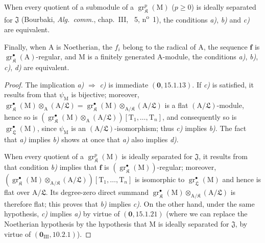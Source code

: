 \begin{theorem}[19.7.1]
When every quotient of a submodule of a $\operatorname{gr}_\mathfrak K^p(\mathrm{M})$ \textup{($p\geqslant 0$)} is ideally separated for $\mathfrak{J}$ \textup{(Bourbaki, \emph{Alg.~comm.}, chap.~III, \textsection~5, n\textsuperscript{o}~1)}, the conditions \emph{a)}, \emph{b)} and \emph{c)} are equivalent.

Finally, when $\mathrm{A}$ is Noetherian, the $f_i$ belong to the radical of $\mathrm{A}$, the sequence $\mathbf{f}$ is $\operatorname{gr}_\mathfrak K^\bullet(\mathrm{A})$-regular, and $\mathrm{M}$ is a finitely generated $\mathrm{A}$-module, the conditions \emph{a)}, \emph{b)}, \emph{c)}, \emph{d)} are equivalent.
\end{theorem}

\begin{proof}
The implication \emph{a)} $\Rightarrow$ \emph{c)} is immediate $(\mathbf{0},15.1.13)$. If \emph{c)} is satisfied, it results from  that $\psi_\mathrm{M}$ is bijective; moreover, $\operatorname{gr}_\mathfrak K^\bullet(\mathrm{M})\otimes_\mathrm{A}(\mathrm{A}/\mathfrak{L})=\operatorname{gr}_\mathfrak K^\bullet(\mathrm{M})\otimes_{\mathrm{A}/\mathfrak K}(\mathrm{A}/\mathfrak{L})$ is a flat $(\mathrm{A}/\mathfrak{L})$-module, hence so is $(\operatorname{gr}_\mathfrak K^\bullet(\mathrm{M})\otimes_\mathrm{A}(\mathrm{A}/\mathfrak{L}))[\mathrm{T}_1,\ldots,\mathrm{T}_n]$, and consequently so is $\operatorname{gr}_\mathfrak{L}^\bullet(\mathrm{M})$, since $\psi_\mathrm{M}$ is an $(\mathrm{A}/\mathfrak{L})$-isomorphism; thus \emph{c)} implies \emph{b)}. The fact that \emph{a)} implies \emph{b)} shows at once that \emph{a)} also implies \emph{d)}.

When every quotient of a $\operatorname{gr}_\mathfrak K^p(\mathrm{M})$ is ideally separated for $\mathfrak{J}$, it results from  that condition \emph{b)} implies that $\mathbf{f}$ is $(\operatorname{gr}_\mathfrak K^\bullet(\mathrm{M}))$-regular; moreover, $(\operatorname{gr}_\mathfrak K^\bullet(\mathrm{M})\otimes_{\mathrm{A}/\mathfrak K}(\mathrm{A}/\mathfrak{L}))[\mathrm{T}_1,\ldots,\mathrm{T}_n]$ is isomorphic to $\operatorname{gr}_\mathfrak{L}^\bullet(\mathrm{M})$ and hence is flat over $\mathrm{A}/\mathfrak{L}$. Its degree-zero direct summand $\operatorname{gr}_\mathfrak K^\bullet(\mathrm{M})\otimes_{\mathrm{A}/\mathfrak K}(\mathrm{A}/\mathfrak{L})$ is therefore flat; this proves that \emph{b)} implies \emph{c)}. On the other hand, under the same hypothesis, \emph{c)} implies \emph{a)} by virtue of $(\mathbf{0},15.1.21)$ (where we can replace the Noetherian hypothesis by the hypothesis that $\mathrm{M}$ is ideally separated for $\mathfrak{J}$, by virtue of $(\mathbf{0}_\mathrm{III},10.2.1)$).


\end{proof}
